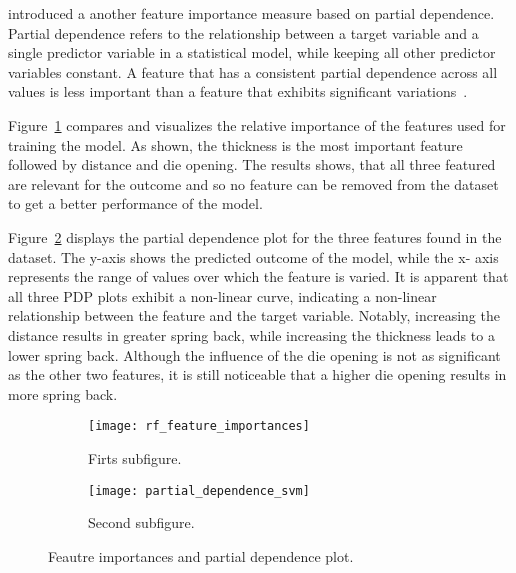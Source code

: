 \cite{greenwell2018simple} introduced a another feature importance measure based on partial
dependence.
Partial dependence refers to the relationship between a target variable and a single predictor
variable in a statistical model, while keeping all other predictor variables constant.
A feature that has a consistent partial dependence across all values is less important than a
feature that exhibits significant variations~\cite[p. 117--118]{molnar2020interpretable}.

Figure~\ref{fig:feature_impoartances_rf} compares and visualizes the relative
importance of the features used for training the model.
As shown, the thickness is the most important feature followed by distance
and die opening.
The results shows, that all three featured are relevant for the outcome and so no feature can be
removed from the dataset to get a better performance of the model.

Figure~\ref{fig:partial_dependence_svm} displays the partial dependence plot for the three
features found in the dataset.
The y-axis shows the predicted outcome of the model, while the x-
axis represents the range of values over which the feature is varied.
It is apparent that all three PDP plots exhibit a non-linear curve, indicating a non-linear
relationship between the feature and the target variable.
Notably, increasing the distance
results in greater spring back, while increasing the thickness leads to a lower spring back.
Although the influence of the die opening is not as significant as the other two features, it is
still noticeable that a higher die opening results in more spring back.

\begin{figure}
    \begin{tcolorbox}[arc=0pt,boxrule=0.5pt]
        \centering
        \begin{subfigure}{0.45\textwidth}
            \texttt{[image: rf\_feature\_importances]}
            \caption{Firts subfigure.}
            \label{fig:feature_impoartances_rf}
        \end{subfigure}
        \hfill
        \begin{subfigure}{0.45\textwidth}
            \texttt{[image: partial\_dependence\_svm]}
            \caption{Second subfigure.}
            \label{fig:partial_dependence_svm}
        \end{subfigure}
        \hfill

        \caption{Feautre importances and partial dependence plot.}
        \label{fig:figures}
    \end{tcolorbox}
\end{figure}


